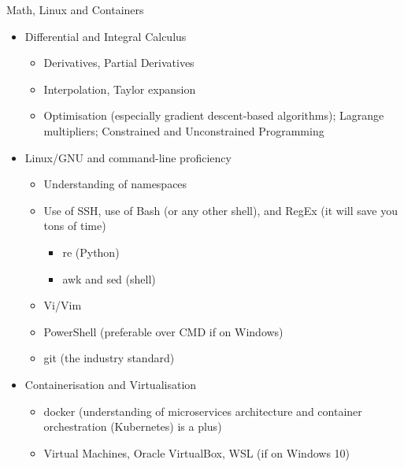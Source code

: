 \documentclass[compress,brown]{beamer}
\begin{document}
\begin{frame}{Math, Linux and Containers}
	\begin{itemize}
		\item Differential and Integral Calculus
		\begin{itemize}
			\item Derivatives, Partial Derivatives
			\item Interpolation, Taylor expansion
			\item Optimisation (especially gradient descent-based algorithms); Lagrange multipliers; Constrained and Unconstrained Programming
		\end{itemize}
	\item Linux/GNU and command-line proficiency
	\begin{itemize}
		\item Understanding of namespaces
		\item Use of SSH, use of Bash (or any other shell), and RegEx (it will save you tons of time)
			\begin{itemize}
				\item re (Python)
				\item awk and sed (shell)
			\end{itemize}
		\item Vi/Vim
		\item PowerShell (preferable over CMD if on Windows)
		\item git (the industry standard)
	\end{itemize}
\item Containerisation and Virtualisation
\begin{itemize}
	\item docker (understanding of microservices architecture and container orchestration (Kubernetes) is a plus)
	\item Virtual Machines, Oracle VirtualBox, WSL (if on Windows 10)
\end{itemize}

	\end{itemize}

\end{frame}
\end{document}
